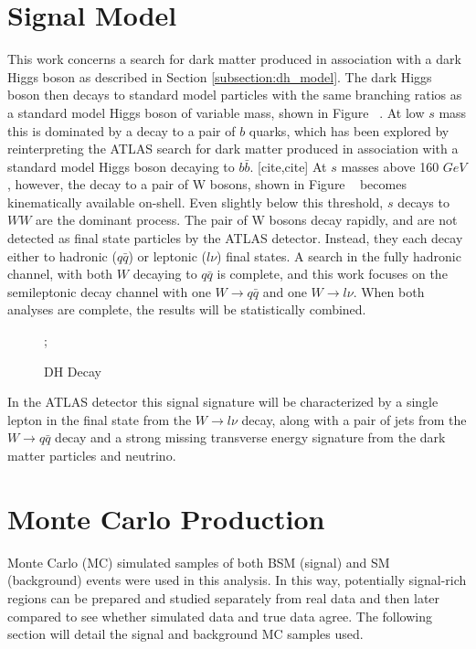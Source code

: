 \label{chapter:ana_prep}

\section{Signal Model}
This work concerns a search for dark matter produced in association with a dark Higgs boson as described in Section \ref{subsection:dh_model}.  The dark Higgs boson then decays to standard model particles with the same branching ratios as a standard model Higgs boson of variable mass, shown in Figure ~. At low $s$ mass this is dominated by a decay to a pair of $b$ quarks, which has been explored by reinterpreting the ATLAS search for dark matter produced in association with a standard model Higgs boson decaying to $b\bar{b}$. [cite,cite] At $s$ masses above 160 $GeV$, however, the decay to a pair of W bosons, shown in Figure ~ becomes kinematically available on-shell. Even slightly below this threshold, $s$ decays to $WW$ are the dominant process. The pair of W bosons decay rapidly, and are not detected as final state particles by the ATLAS detector. Instead, they each decay either to hadronic ($q\bar{q}$) or leptonic ($l\nu$) final states. A search in the fully hadronic channel, with both $W$ decaying to $q\bar{q}$ is complete, and this work focuses on the semileptonic decay channel with one $ W \rightarrow q\bar{q} $ and one $ W \rightarrow l\nu $. When both analyses are complete, the results will be statistically combined.

\begin{figure}[H]
    \centering
    ;
    \caption{DH Decay}
    \label{fig:dh_feynman}
\end{figure}

In the ATLAS detector this signal signature will be characterized by a single lepton in the final state from the $ W \rightarrow l\nu $ decay, along with a pair of jets from the $ W \rightarrow q\bar{q} $ decay and a strong missing transverse energy signature from the dark matter particles and neutrino.

\section{Monte Carlo Production}
\label{section:mc_prod}
Monte Carlo (MC) simulated samples of both BSM (signal) and SM (background) events were used in this analysis. In this way, potentially signal-rich regions can be prepared and studied separately from real data and then later compared to see whether simulated data and true data agree. The following section will detail the signal and background MC samples used.

